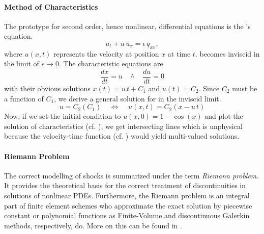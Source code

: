 \paragraph{Method of Characteristics}
The prototype for second order, hence nonlinear, differential equations is the
's equation.
\begin{equation}
\label{eqn:burger}
    u_t + u \, u_x = \epsilon \, q_{xx},
\end{equation}
where $u(x,t)$ represents the velocity at position $x$ at time $t$. 
becomes inviscid in the limit of $\epsilon \to 0$. The characteristic equations
are
\begin{equation}
\label{eqn:burger-characteristics}
    \frac{dx}{dt} = u \;\;\;\wedge\;\;\; \frac{du}{dt} = 0
\end{equation}
with their obvious solutions $x(t) = u\,t + C_1$ and $u(t) = C_2$. Since $C_2$
must be a function of $C_1$, we derive a general solution for  in
the inviscid limit.
\begin{equation}
\label{eqn:burger-general-solution}
    u = C_2(C_1) \;\;\;\; \Longleftrightarrow \;\;\;\; u(x,t) = C_2(x - u\,t)
\end{equation}
Now, if we set the initial condition to $u(x,0) = 1 - \cos(x)$ and plot the
solution of characteristics (cf. ), we
get intersecting lines which is unphysical because the velocity-time
function (cf. ) would yield multi-valued solutions.

\paragraph{Riemann Problem}
The correct modelling of shocks is summarized under the term \emph{Riemann
problem}. It provides the theoretical basis for the correct treatment of
discontinuities in solutions of nonlinear PDEs. Furthermore, the Riemann
problem is an integral part of finite element schemes who approximate the
exact solution by piecewise constant or polynomial functions as
Finite-Volume and discontinuous Galerkin methods, respectively, do. More
on this can be found in .

